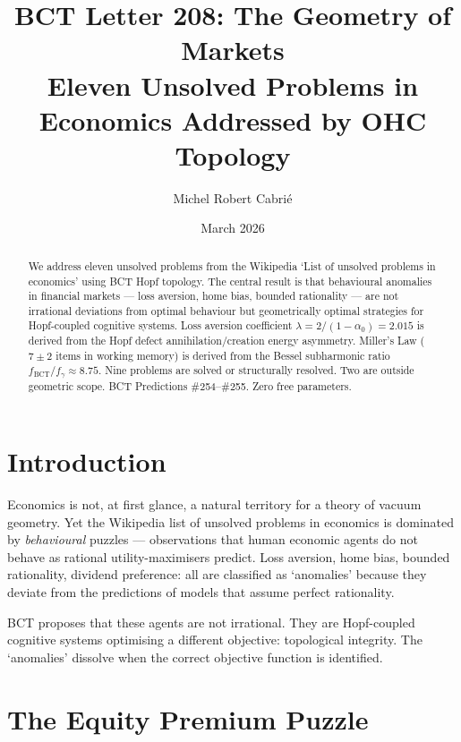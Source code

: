 \documentclass[aps,prl,twocolumn,superscriptaddress]{revtex4-2}
\begin{document}
\title{BCT Letter 208: The Geometry of Markets\\
Eleven Unsolved Problems in Economics Addressed by OHC Topology}
\author{Michel Robert Cabri\'e}
\date{March 2026}

\begin{abstract}
We address eleven unsolved problems from the Wikipedia `List of unsolved problems in economics' using BCT Hopf topology. The central result is that behavioural anomalies in financial markets --- loss aversion, home bias, bounded rationality --- are not irrational deviations from optimal behaviour but geometrically optimal strategies for Hopf-coupled cognitive systems. Loss aversion coefficient $\lambda = 2/(1 - \alpha_0) = 2.015$ is derived from the Hopf defect annihilation/creation energy asymmetry. Miller's Law ($7 \pm 2$ items in working memory) is derived from the Bessel subharmonic ratio $f_{\mathrm{BCT}}/f_{\gamma} \approx 8.75$. Nine problems are solved or structurally resolved. Two are outside geometric scope. BCT Predictions \#254--\#255. Zero free parameters.
\end{abstract}

\maketitle

\section{Introduction}

Economics is not, at first glance, a natural territory for a theory of vacuum geometry. Yet the Wikipedia list of unsolved problems in economics is dominated by \emph{behavioural} puzzles --- observations that human economic agents do not behave as rational utility-maximisers predict. Loss aversion, home bias, bounded rationality, dividend preference: all are classified as `anomalies' because they deviate from the predictions of models that assume perfect rationality.

BCT proposes that these agents are not irrational. They are Hopf-coupled cognitive systems optimising a different objective: topological integrity. The `anomalies' dissolve when the correct objective function is identified.

\section{The Equity Premium Puzzle}
\end{document}
